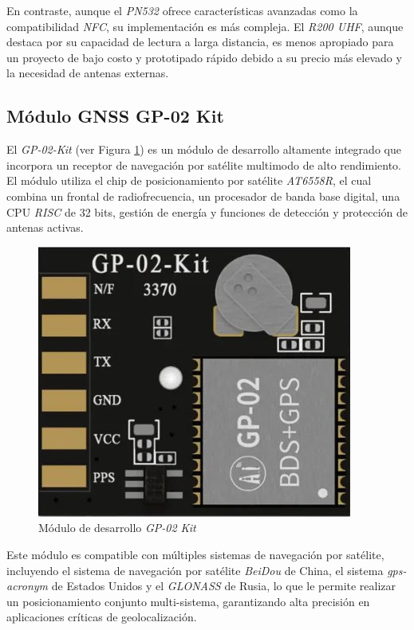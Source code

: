 En contraste, aunque el \textit{PN532} ofrece características avanzadas como la compatibilidad \textit{NFC}, su implementación es más compleja. El \textit{R200 UHF}, aunque destaca por su capacidad de lectura a larga distancia, es menos apropiado para un proyecto de bajo costo y prototipado rápido debido a su precio más elevado y la necesidad de antenas externas.

\subsection{Módulo GNSS GP-02 Kit}

El \textit{GP-02-Kit} (ver Figura \ref{fig:gnssgp}) es un módulo de desarrollo altamente integrado que incorpora un receptor de navegación por satélite multimodo de alto rendimiento. El módulo utiliza el chip de posicionamiento por satélite \textit{AT6558R}, el cual combina un frontal de radiofrecuencia, un procesador de banda base digital, una CPU \textit{RISC} de 32 bits, gestión de energía y funciones de detección y protección de antenas activas.

\begin{figure}[H]
\leavevmode
\begin{minipage}{\textwidth}
\begin{center}
\includegraphics[scale=0.5]{./capitulo_03/figures/HW/GP-02.jpg}
\caption{Módulo de desarrollo \textit{GP-02 Kit} \label{fig:gnssgp}}
\end{center}
\end{minipage}
\end{figure}

Este módulo es compatible con múltiples sistemas de navegación por satélite, incluyendo el sistema de navegación por satélite \textit{BeiDou} de China, el sistema \textit{\acrshort{gps-acronym}} de Estados Unidos y el \textit{GLONASS} de Rusia, lo que le permite realizar un posicionamiento conjunto multi-sistema, garantizando alta precisión en aplicaciones críticas de geolocalización.

